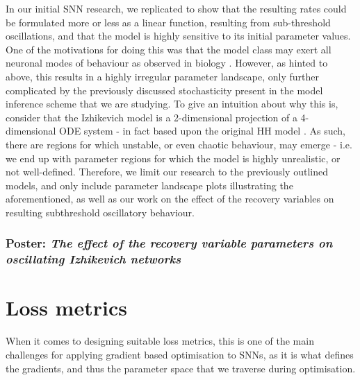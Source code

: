 \documentclass[mphil,deptreport,ianc]{infthesis} %
\begin{document}
In our initial SNN research, we replicated \cite{Oliveira2019} to show that the resulting rates could be formulated more or less as a linear function, resulting from sub-threshold oscillations, and that the model is highly sensitive to its initial parameter values.
One of the motivations for doing this was that the model class may exert all neuronal modes of behaviour as observed in biology \cite{Izhikevich2006}.
However, as hinted to above, this results in a highly irregular parameter landscape, only further complicated by the previously discussed stochasticity present in the model inference scheme that we are studying.
To give an intuition about why this is, consider that the Izhikevich model is a 2-dimensional projection of a 4-dimensional ODE system - in fact based upon the original HH model \cite{HH1952}.
As such, there are regions for which unstable, or even chaotic behaviour, may emerge - i.e. we end up with parameter regions for which the model is highly unrealistic, or not well-defined.
Therefore, we limit our research to the previously outlined models, and only include parameter landscape plots illustrating the aforementioned, as well as our work on the effect of the recovery variables on resulting subthreshold oscillatory behaviour.



\subsubsection{Poster: \textit{The effect of the recovery variable parameters on oscillating Izhikevich networks}}



\section{Loss metrics}


When it comes to designing suitable loss metrics, this is one of the main challenges for applying gradient based optimisation to SNNs, as it is what defines the gradients, and thus the parameter space that we traverse during optimisation.
\end{document}
